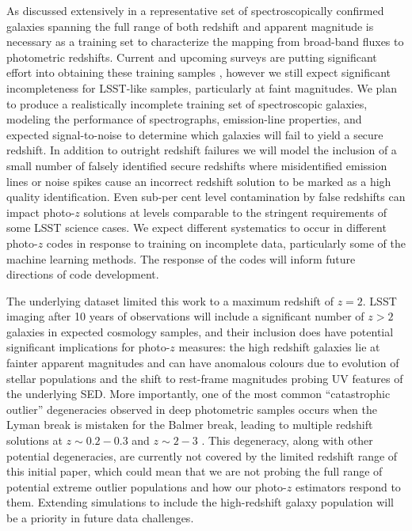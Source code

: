 As discussed extensively in \citet{Newman:2015} a representative set of spectroscopically confirmed galaxies spanning the full range of both redshift and apparent magnitude is necessary as a training set to characterize the mapping from broad-band fluxes to photometric redshifts.
Current and upcoming surveys are putting significant effort into obtaining these training samples \citep[e.~g.\,][]{Masters:2017}, however we still expect significant incompleteness for LSST-like samples, particularly at faint magnitudes.  We plan to produce a realistically incomplete training set of spectroscopic galaxies, modeling the performance of spectrographs, emission-line properties, and expected signal-to-noise to determine which galaxies will fail to yield a secure redshift.  In addition to outright redshift failures we will model the inclusion of a small number of falsely identified secure redshifts where misidentified emission lines or noise spikes cause an incorrect redshift solution to be marked as a high quality identification.  Even sub-per cent level contamination by false redshifts can impact photo-$z$ solutions at levels comparable to the stringent  requirements of some LSST science cases.
We expect different systematics to occur in different photo-$z$ codes in response to training on incomplete data, particularly some of the machine learning methods.  The response of the codes will inform future directions of code development.

The underlying dataset limited this work to a maximum redshift of $z=2$.  LSST imaging after 10 years of observations will include a significant number of $z>2$ galaxies in expected cosmology samples, and their inclusion does have potential significant implications for photo-$z$ measures: the high redshift galaxies lie at fainter apparent magnitudes and can have anomalous colours due to evolution of stellar populations and the shift to rest-frame magnitudes probing UV features of the underlying SED.  More importantly, one of the most common ``catastrophic outlier'' degeneracies observed in deep photometric samples occurs when the Lyman break is mistaken for the Balmer break, leading to multiple redshift solutions at $z\sim0.2-0.3$ and $z\sim2-3$ \citep{Massarotti:2001}.  This degeneracy, along with other potential degeneracies, are currently not covered by the limited redshift range of this initial paper, which could mean that we are not probing the full range of potential extreme outlier populations and how our photo-$z$ estimators respond to them. Extending simulations to include the high-redshift galaxy population will be a priority in future data challenges.

